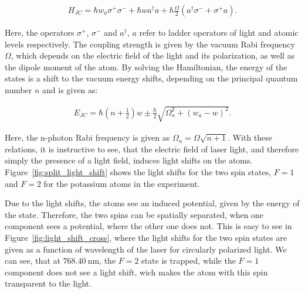 \begin{align}
	H_{JC} = \hbar w_a \sigma^+ \sigma^- + \hbar w a^\dagger a + \hbar \frac{\Omega}{2}\left(a^\dagger \sigma^- + \sigma^+ a\right).
\end{align}

Here, the operators $\sigma^+$, $\sigma^-$ and $a^\dagger$, $a$ refer to ladder operators of light and atomic levels respectively. The coupling strength is given by the vacuum Rabi frequency $\Omega$, which depends on the electric field of the light and its polarization, as well as the dipole moment of the atom.
By solving the Hamiltonian, the energy of the states is a shift to the vacuum energy shifts, depending on the principal quantum number $n$ and is given as:

\begin{align}
	E_{JC} = \hbar \left(n + \frac{1}{2} \right) w \pm \frac{\hbar}{2} \sqrt{\Omega_n^2 + {\left(w_a - w\right)}^2}.
\end{align}

Here, the n-photon Rabi frequency is given as $\Omega_n = \Omega\sqrt{n+1}$. With these relations, it is instructive to see, that the electric field of laser light, and therefore simply the presence of a light field, induces light shifts on the atoms. Figure~\ref{fig:split_light_shift} shows the light shifts for the two spin states, $F=1$ and $F=2$ for the potassium atoms in the experiment.

\begin{figure}[t]%
%
\end{figure}%

Due to the light shifts, the atoms see an induced potential, given by the energy of the state. Therefore, the two spins can be spatially separated, when one component sees a potential, where the other one does not. This is easy to see in Figure~\ref{fig:light_shift_cross}, where the light shifts for the two spin states are given as a function of wavelength of the laser for circularly polarized light. We can see, that at $\SI{768.40}{\nano\meter}$, the $F=2$ state is trapped, while the $F=1$ component does not see a light shift, wich makes the atom with this spin transparent to the light.

